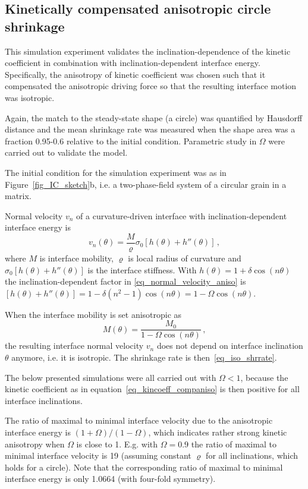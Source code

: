 \subsection{Kinetically compensated anisotropic circle shrinkage}
This simulation experiment validates the inclination-dependence of the kinetic coefficient in combination with inclination-dependent interface energy. 
Specifically, the anisotropy of kinetic coefficient was chosen such that it compensated the anisotropic driving force so that the resulting interface motion was isotropic. 

Again, the match to the steady-state shape (a circle) was quantified by Hausdorff distance and the mean shrinkage rate was measured when the shape area was a fraction 0.95-0.6 relative to the initial condition. Parametric study in $\Omega$ were carried out to validate the model.

The initial condition for the simulation experiment was as in Figure~\ref{fig_IC_sketch}b, i.e. a two-phase-field system of a circular grain in a matrix.  

Normal velocity $v_n$ of a curvature-driven interface with inclination-dependent interface energy is~\cite{Abdeljawad2018}
\begin{equation}\label{eq_normal_velocity_aniso}
	v_n(\theta) = \frac{M}{\varrho}  \sigma_0[h(\theta)+h''(\theta)]\,,
\end{equation}
where $M$ is interface mobility, $\varrho$ is local radius of curvature and $\sigma_0[h(\theta)+h''(\theta)]$ is the interface stiffness. With $h(\theta)=1+\delta\cos(n\theta)$ the inclination-dependent factor in \eqref{eq_normal_velocity_aniso} is $[h(\theta)+h''(\theta)] = 1 - \delta(n^2-1)\cos(n\theta) = 1-\Omega\cos(n\theta)$.

When the interface mobility is set anisotropic as
\begin{equation} \label{eq_kincoeff_companiso}
	M(\theta) = \frac{M_0}{1-\Omega\cos(n\theta)} \,,
\end{equation}
the resulting interface normal velocity $v_n$ does not depend on interface inclination $\theta$ anymore, i.e. it is isotropic. The shrinkage rate is then~\eqref{eq_iso_shrrate}.

The below presented simulations were all carried out with $\Omega<1$, because the kinetic coefficient as in equation~\eqref{eq_kincoeff_companiso} is then positive for all interface inclinations. 

The ratio of maximal to minimal interface velocity due to the anisotropic interface energy is $(1+\Omega)/(1-\Omega)$, which indicates rather strong kinetic anisotropy when $\Omega$ is close to 1. E.g. with $\Omega=0.9$ the ratio of maximal to minimal interface velocity is 19 (assuming constant $\varrho$ for all inclinations, which holds for a circle). Note that the corresponding ratio of maximal to minimal interface energy is only 1.0664 (with four-fold symmetry).

